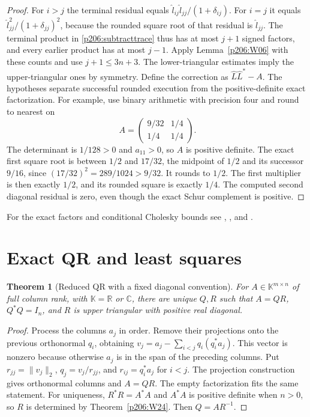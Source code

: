 \documentclass[11pt,oneside,openany]{book}
\theoremstyle{plain}
\newtheorem{theorem}{Theorem}[chapter]
\theoremstyle{definition}
\theoremstyle{remark}
\begin{document}
\begin{proof}
For \(i>j\) the terminal residual equals
\(\hat l_{ij}\hat l_{jj}/(1+\delta_{ij})\). For \(i=j\)
it equals \(\hat l_{jj}^2/(1+\delta_{jj})^2\), because the
rounded square root of that residual is \(\hat l_{jj}\).
The terminal product in \eqref{p206:subtracttrace} thus has at most \(j+1\)
signed factors, and every earlier product has at most \(j-1\).
Apply Lemma~\ref{p206:W06} with these counts and use
\(j+1\le 3n+3\). The lower-triangular estimates imply the
upper-triangular ones by symmetry. Define the correction
as \(\hat L\hat L^*-A\).
The hypotheses separate successful rounded execution from
the positive-definite exact factorization. For example, use binary
arithmetic with precision four and round to nearest on
\[
 A=\begin{pmatrix}9/32&1/4\\1/4&1/4\end{pmatrix}.
\]
The determinant is \(1/128>0\) and \(a_{11}>0\), so \(A\) is
positive definite. The exact first square root is between
\(1/2\) and \(17/32\), the midpoint of \(1/2\) and its
successor \(9/16\), since
\((17/32)^2=289/1024>9/32\). It rounds to \(1/2\). The first
multiplier is then exactly \(1/2\), and its rounded square is
exactly \(1/4\). The computed second diagonal residual is zero,
even though the exact Schur complement is positive.
\end{proof}

For the exact factors and conditional Cholesky bounds see
\cite[Chapter~10]{higham}, \cite[Section~4.2]{golub}, and
\cite[entry 14.qr\_cholesky]{d05}.

\section{Exact QR and least squares}

\begin{theorem}[Reduced QR with a fixed diagonal convention]
\label{p206:W27}
For \(A\in\mathbb K^{m\times n}\) of full column rank, with
\(\mathbb K=\mathbb R\) or \(\mathbb C\), there are unique
\(Q,R\) such that \(A=QR\), \(Q^*Q=I_n\), and \(R\) is upper
triangular with positive real diagonal.
\end{theorem}

\begin{proof}
Process the columns \(a_j\) in order. Remove their projections
onto the previous orthonormal \(q_i\), obtaining
\(v_j=a_j-\sum_{i<j}q_i(q_i^*a_j)\). This vector is nonzero
because otherwise \(a_j\) is in the span of the preceding
columns. Put \(r_{jj}=\|v_j\|_2\), \(q_j=v_j/r_{jj}\),
and \(r_{ij}=q_i^*a_j\) for \(i<j\). The projection construction
gives orthonormal columns and \(A=QR\). The empty factorization
fits the same statement. For uniqueness, \(R^*R=A^*A\) and
\(A^*A\) is positive definite when \(n>0\), so \(R\) is
determined by Theorem~\ref{p206:W24}. Then \(Q=AR^{-1}\).
\end{proof}
\end{document}
